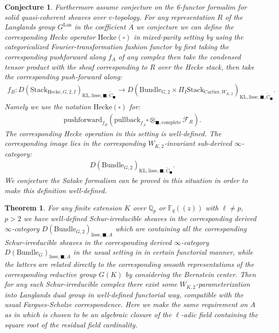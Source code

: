 \documentclass[12pt]{book}
\newtheorem{conjecture}{Conjecture}
\newtheorem{theorem}{Theorem}
\theoremstyle{definition}
\begin{document}
\begin{conjecture}
Furthermore assume conjecture on the 6-functor formalim for solid quasi-coherent sheaves over $v$-topology. For any representation $R$ of the Langlands group $G^\mathrm{Lan}$ in the coefficient $A$ we conjecture we can define the corresponding Hecke operator $\mathrm{Hecke}(\square)$ in mixed-parity setting by using the categoricalized Fourier-transformation fashion functor by first taking the corresponding pushforward along $f_A$ of any complex then take the condensed tensor product with the sheaf corresponding to $R$ over the Hecke stack, then take the corresponding push-forward along:
\begin{align}
f_B: D(\mathrm{Stack}_{\mathrm{Hecke},G,2,I})_{\text{KL},\mathrm{lisse},\blacksquare,\widetilde{C}_\blacksquare} \rightarrow D(\mathrm{Bundle}_{G,2}\times \Pi_I \mathrm{Stack}_{\mathrm{Cartier},W_{K,2}})_{\text{KL},\mathrm{lisse},\blacksquare,\widetilde{C}_\blacksquare}.
\end{align}
Namely we use the notation $\mathrm{Hecke}(\square)$ for:
\begin{align}
\mathrm{pushforward}_{f_B}(\mathrm{pullback}_{f_A}\square\otimes_{\blacksquare,\mathrm{complete}}\mathcal{F}_R).
\end{align}
The corresponding Hecke operation in this setting is well-defined. The corresponding image lies in the corresponding $W_{K,2}$-invariant sub-derived $\infty$-category:
\begin{align}
D(\mathrm{Bundle}_{G,2})_{\text{KL},\mathrm{lisse},\blacksquare,\widetilde{C}_\blacksquare}.
\end{align}
We conjecture the Satake formalism can be proved in this situation in order to make this definition well-defined.
\end{conjecture}

\begin{theorem}
For any finite extension $K$ over $\mathbb{Q}_p$ or $\mathbb{F}_q((z))$ with $\ell\neq p$, $p>2$ we have well-defined Schur-irreducible sheaves in the corresponding derived $\infty$-category $D(\mathrm{Bundle}_{G,2})_{\text{lisse},\blacksquare,A}$ which are containing all the corresponding Schur-irreducible sheaves in the corresponding derived $\infty$-category $D(\mathrm{Bundle}_{G})_{\text{lisse},\blacksquare,A}$ in the usual setting in \cite{FS} in certain functorial manner, while the latters are related directly to the corresponding smooth representations of the corresponding reductive group $G(K)$ by considering the Bernstein center. Then for any such Schur-irreducible complex there exist some $W_{K,2}$-parameterization into Langlands dual group in well-defined functorial way, compatible with the usual Fargues-Scholze correspondence. Here we make the same requirement on $A$ as in \cite{FS} which is chosen to be an algebraic closure of the $\ell$-adic field containing the square root of the residual field cardinality.
\end{theorem}
\end{document}
